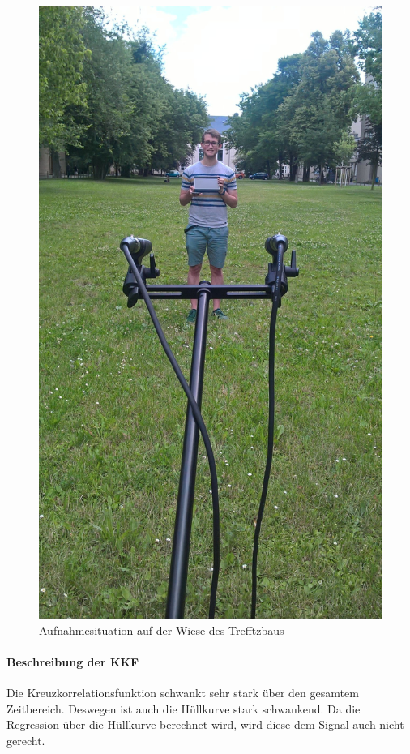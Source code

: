 \begin{figure}[ht!]
  \centering
  \includegraphics[width=\textwidth]{img/wiese}
  \caption{Aufnahmesituation auf der Wiese des Trefftzbaus}
  \label{figure4}
\end{figure}

\paragraph{Beschreibung der KKF} Die Kreuzkorrelationsfunktion schwankt sehr stark über den gesamtem Zeitbereich. Deswegen ist auch die Hüllkurve stark schwankend. Da die Regression über die Hüllkurve berechnet wird, wird diese dem Signal auch nicht gerecht.
